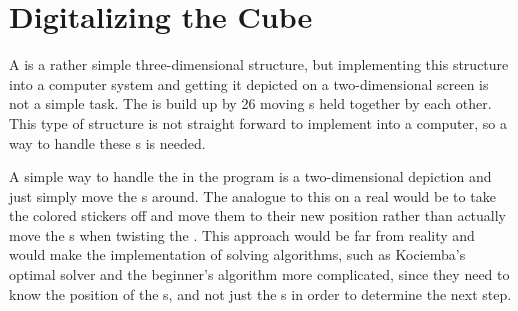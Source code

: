 \chapter{Digitalizing the Cube}
A \rubik{} is a rather simple three-dimensional structure, but implementing this structure into a computer system and getting it depicted on a two-dimensional screen is not a simple task.
The \rubik{} is build up by 26 moving \cpiece{}s held together by each other.  This type of structure is not straight forward to implement into a computer, so a way to handle these \cpiece{}s is needed.

A simple way to handle the \rubik{} in the program is a two-dimensional depiction and  just simply move the \facelet{}s around.
The analogue to this on a real \rubik{} would be to take the colored stickers off and move them to their new position rather than actually move the \cubie{}s when twisting the \rubik{}.
This approach would be far from reality and would make the implementation of solving algorithms, such as Kociemba's optimal solver and the beginner's algorithm more complicated, since they need to know the position of the \cpiece{}s, and not just the \facelet{}s in order to determine the next step.

	

